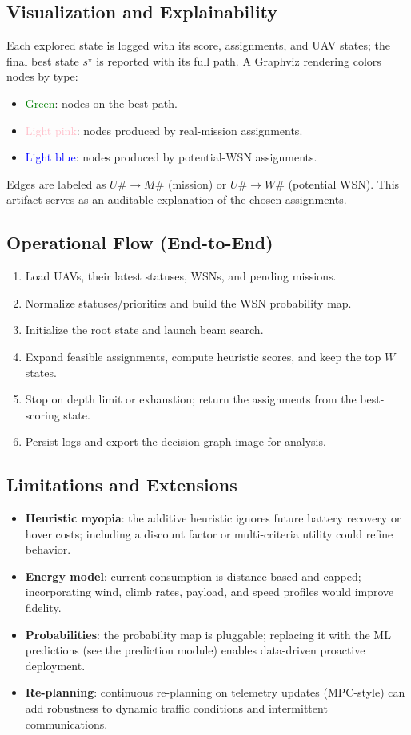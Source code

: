 \subsection*{Visualization and Explainability}
Each explored state is logged with its score, assignments, and UAV states; the final best state
\(s^\star\) is reported with its full path. A Graphviz rendering colors nodes by type:
\begin{itemize}
  \item \textcolor{green}{Green}: nodes on the best path.
  \item \textcolor{pink}{Light pink}: nodes produced by real-mission assignments.
  \item \textcolor{blue}{Light blue}: nodes produced by potential-WSN assignments.
\end{itemize}
Edges are labeled as \(U\# \rightarrow M\#\) (mission) or \(U\# \rightarrow W\#\) (potential WSN).
This artifact serves as an auditable explanation of the chosen assignments.

\subsection*{Operational Flow (End-to-End)}
\begin{enumerate}
  \item Load UAVs, their latest statuses, WSNs, and pending missions.
  \item Normalize statuses/priorities and build the WSN probability map.
  \item Initialize the root state and launch beam search.
  \item Expand feasible assignments, compute heuristic scores, and keep the top \(W\) states.
  \item Stop on depth limit or exhaustion; return the assignments from the best-scoring state.
  \item Persist logs and export the decision graph image for analysis.
\end{enumerate}

\subsection*{Limitations and Extensions}
\begin{itemize}
  \item \textbf{Heuristic myopia}: the additive heuristic ignores future battery recovery or hover costs;
        including a discount factor or multi-criteria utility could refine behavior.
  \item \textbf{Energy model}: current consumption is distance-based and capped; incorporating wind,
        climb rates, payload, and speed profiles would improve fidelity.
  \item \textbf{Probabilities}: the probability map is pluggable; replacing it with the ML predictions
        (see the prediction module) enables data-driven proactive deployment.
  \item \textbf{Re-planning}: continuous re-planning on telemetry updates (MPC-style) can add robustness
        to dynamic traffic conditions and intermittent communications.
\end{itemize}

